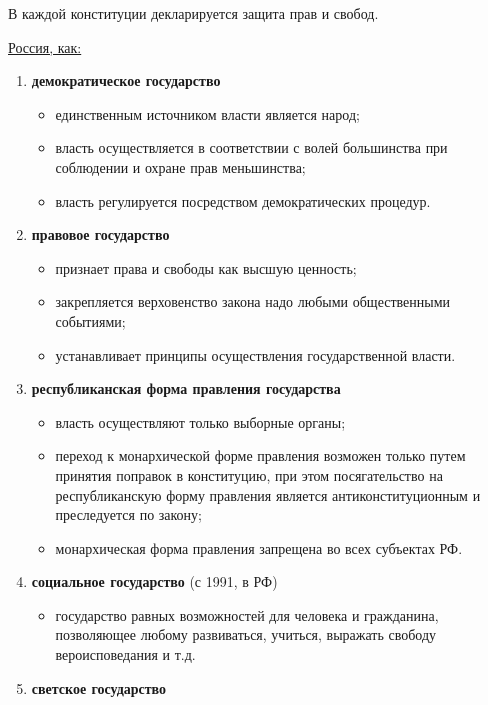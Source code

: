 \documentclass[a5paper,10pt]{article}
\begin{document}
		В каждой конституции декларируется защита прав и свобод.

		\underline{Россия, как:}
		\begin{enumerate}
			\item \textbf{демократическое государство}
				\begin{itemize}[itemsep=0pt]
					\item единственным источником власти является народ;
					\item власть осуществляется в соответствии с волей большинства при соблюдении и охране прав меньшинства;
					\item власть регулируется посредством демократических процедур.
				\end{itemize}

			\item \textbf{правовое государство}
				\begin{itemize}[itemsep=0pt]
					\item признает права и свободы как высшую ценность;
					\item закрепляется верховенство закона надо любыми общественными событиями;
					\item устанавливает принципы осуществления государственной власти.
				\end{itemize}

			\item \textbf{республиканская форма правления государства}
				\begin{itemize}[itemsep=0pt]
					\item власть осуществляют только выборные органы;
					\item переход к монархической форме правления возможен только путем принятия поправок в конституцию, при этом посягательство на республиканскую форму правления является антиконституционным и преследуется по закону;
					\item монархическая форма правления запрещена во всех субъектах РФ.
				\end{itemize}

			\item \textbf{социальное государство} (с 1991, в РФ)
				\begin{itemize}[itemsep=0pt]
					\item государство равных возможностей для человека и гражданина, позволяющее любому развиваться, учиться, выражать свободу вероисповедания и т.д.
				\end{itemize}

			\item \textbf{светское государство}
		\end{enumerate}
\end{document}
